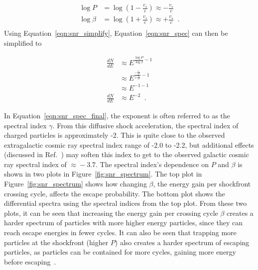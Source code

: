   \begin{equation}\label{eqn:snr_simplify}
    \begin{split}
       \log P     & = \log \left ( 1 - \frac{v_s}{c} \right ) \approx - \frac{v_s}{c} \\
       \log \beta & = \log \left ( 1 + \frac{v_s}{c} \right ) \approx + \frac{v_s}{c} \;\; .\\
    \end{split}
  \end{equation}
  Using Equation~\ref{eqn:snr_simplify}, Equation~\ref{eqn:snr_spec} can then be simplified to
  
  \begin{equation}\label{eqn:snr_spec_final}
    \begin{split}
      \frac{dN}{dE} & \approx E^{ \frac{\log P}{\log \beta} - 1 } \\
                    & \approx E^{ \frac{ -\frac{v_s}{c} }{ +\frac{v_s}{c} } - 1 } \\
                    & \approx E^{ -1 - 1 } \\
      \frac{dN}{dE} & \approx E^{ -2 } \;\; .
    \end{split}
  \end{equation}

  In Equation~\ref{eqn:snr_spec_final}, the exponent is often referred to as the spectral index $\gamma$.
  From this diffusive shock acceleration, the spectral index of charged particles is approximately -2.
  This is quite close to the observed extragalactic cosmic ray spectral index range of -2.0 to -2.2, but additional effects (discussed in Ref.~\cite{cosmicrayspectrumorigin}) may soften this index to get to the observed galactic cosmic ray spectral index of $\approx{}-3.7$.
  The spectral index's dependence on $P$ and $\beta$ is shown in two plots in Figure~\ref{fig:snr_spectrum}.
  The top plot in Figure~\ref{fig:snr_spectrum} shows how changing $\beta$, the energy gain per shockfront crossing cycle, affects the escape probability.
  The bottom plot shows the differential spectra using the spectral indices from the top plot.
  From these two plots, it can be seen that increasing the energy gain per crossing cycle $\beta$ creates a harder spectrum of particles with more higher energy particles, since they can reach escape energies in fewer cycles.
  It can also be seen that trapping more particles at the shockfront (higher $P$) also creates a harder spectrum of escaping particles, as particles can be contained for more cycles, gaining more energy before escaping~\cite{dsa6}.

